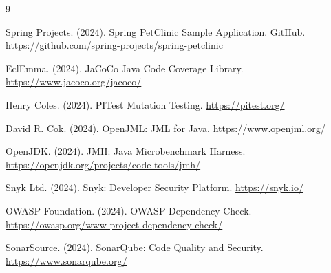 \documentclass[sigconf]{acmart}
\begin{document}


\begin{thebibliography}{9}

Spring Projects. (2024). Spring PetClinic Sample Application. GitHub. \url{https://github.com/spring-projects/spring-petclinic}

EclEmma. (2024). JaCoCo Java Code Coverage Library. \url{https://www.jacoco.org/jacoco/}

Henry Coles. (2024). PITest Mutation Testing. \url{https://pitest.org/}

David R. Cok. (2024). OpenJML: JML for Java. \url{https://www.openjml.org/}

OpenJDK. (2024). JMH: Java Microbenchmark Harness. \url{https://openjdk.org/projects/code-tools/jmh/}

Snyk Ltd. (2024). Snyk: Developer Security Platform. \url{https://snyk.io/}

OWASP Foundation. (2024). OWASP Dependency-Check. \url{https://owasp.org/www-project-dependency-check/}

SonarSource. (2024). SonarQube: Code Quality and Security. \url{https://www.sonarqube.org/}

\end{thebibliography}
\end{document}
